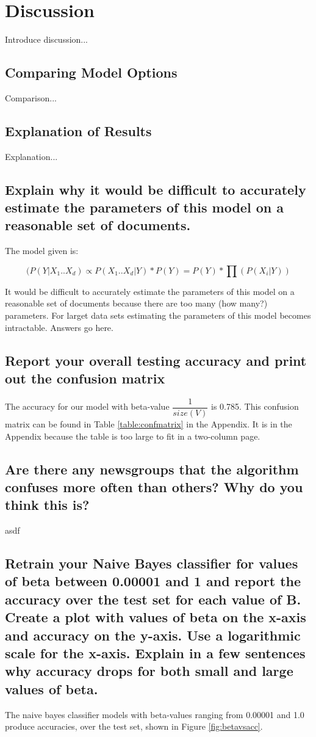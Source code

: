 \documentclass{IEEEtran}
\begin{document}
\section{Discussion}
Introduce discussion...

\subsection{Comparing Model Options}
Comparison...

\subsection{Explanation of Results}
Explanation...

\subsection{Explain why it would be difficult to accurately estimate the parameters of this model on a reasonable set of documents.}
The model given is:

\begin{equation}
\label{entropy-equation}
(P(Y|X_1 .. X_d) \propto P(X_1..X_d|Y)*P(Y) = P(Y)*\prod(P(X_i|Y))
\end{equation}

It would be difficult to accurately estimate the parameters of this model on a reasonable set of documents because there are too many (how many?) parameters. For larget data sets estimating the parameters of this model becomes intractable.
Answers go here.

\subsection{Report your overall testing accuracy and print out the confusion matrix}
The accuracy for our model with beta-value $\dfrac{1}{size(V)}$ is 0.785. This confusion matrix can be found in Table \ref{table:confmatrix} in the Appendix. It is in the Appendix because the table is too large to fit in a two-column page.

\subsection{Are there any newsgroups that the algorithm confuses more often than others? Why do you think this is?}
asdf

\subsection{Retrain your Naive Bayes classifier for values of beta between 0.00001 and 1 and report the accuracy over the test set for each value of B. Create a plot with values of beta on the x-axis and accuracy on the y-axis. Use a logarithmic scale for the x-axis. Explain in a few sentences why accuracy drops for both small and large values of beta.}
The naive bayes classifier models with beta-values ranging from 0.00001 and 1.0 produce accuracies, over the test set, shown in Figure \ref{fig:betavsacc}.
\end{document}
